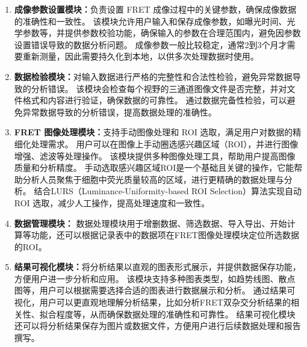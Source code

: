 \begin{enumerate}
  \item \textbf{成像参数设置模块：}负责设置 FRET 成像过程中的关键参数，确保成像数据的准确性和一致性。
  该模块允许用户输入和保存成像参数，如曝光时间、光学参数等，并提供参数校验功能，确保输入的参数在合理范围内，避免因参数设置错误导致的数据分析问题。
  成像参数一般比较稳定，通常2到3个月才需要重新测量，因此需要持久化到本地，以供多次处理数据时使用。
  \item \textbf{数据检验模块：}对输入数据进行严格的完整性和合法性检验，避免异常数据导致的分析错误。
  该模块会检查每个视野的三通道图像文件是否完整，并对文件格式和内容进行验证，确保数据的可靠性。
  通过数据完备性检验，可以避免异常数据导致的分析错误，提高数据处理的准确性。
  \item \textbf{FRET 图像处理模块：}支持手动图像处理和 ROI 选取，满足用户对数据的精细化处理需求。
  用户可以在图像上手动圈选感兴趣区域（ROI），并进行图像增强、滤波等处理操作。
  该模块提供多种图像处理工具，帮助用户提高图像质量和分析精度。
  手动选取感兴趣区域ROI是一个基础且关键的操作，它能帮助分析人员聚焦于细胞中荧光质量较高的区域，进行更精确的数据处理与分析。
  结合LURS（Luminance-Uniformity-based ROI Selection）算法实现自动 ROI 选取，减少人工操作，提高处理速度和一致性。
  \item \textbf{数据管理模块：}
  数据处理模块用于增删数据、筛选数据、导入导出、开始计算等功能，还可以根据记录表中的数据项在FRET图像处理模块定位所选数据的ROI。
  \item \textbf{结果可视化模块：}将分析结果以直观的图表形式展示，并提供数据保存功能，方便用户进一步分析和应用。
  该模块支持多种图表类型，如趋势线图、散点图等，用户可以根据需要选择合适的图表进行数据展示和分析。
  通过结果可视化，用户可以更直观地理解分析结果，比如分析FRET双杂交分析结果的相关性、拟合程度等，从而确保数据处理的准确性和可靠性。
  结果可视化模块还可以将分析结果保存为图片或数据文件，方便用户进行后续数据处理和报告撰写。
  
\end{enumerate}

